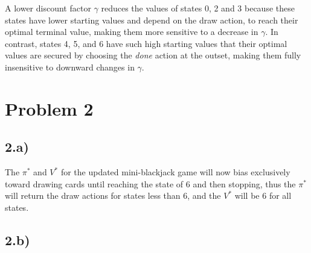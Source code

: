 \documentclass[11pt]{article}
\begin{document}
A lower discount factor \(\gamma\) reduces the values of states 0, 2 and 3 because these states have lower starting values and depend on the draw action,
to reach their optimal terminal value, making them more sensitive to a decrease in $\gamma$.
In contrast, states 4, 5, and 6 have such high starting values that their optimal values are secured by choosing the \textit{done} action at the outset,
making them fully insensitive to downward changes in $\gamma$.

\section*{Problem 2}
\subsection*{2.a)}
The $\pi^*$ and $V^*$ for the updated mini-blackjack game will now bias exclusively toward drawing cards until reaching the state of 6 and
then stopping, thus the $\pi^*$ will return the draw actions for states less than 6, and the $V^*$ will be 6 for all states.

\subsection*{2.b)}
\end{document}
